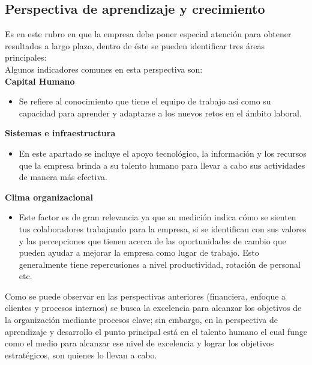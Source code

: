 \subsection{Perspectiva de aprendizaje y crecimiento}

Es en este rubro en que la empresa debe poner especial atención para obtener resultados a largo plazo, dentro de éste se pueden identificar tres áreas principales:\\

Algunos indicadores comunes en esta perspectiva son:\\

\textbf {Capital Humano}
\begin{itemize}
	\item Se refiere al conocimiento que tiene el equipo de trabajo así como su capacidad para aprender y adaptarse a los nuevos retos en el ámbito laboral.
\end{itemize}

\textbf {Sistemas e infraestructura}
\begin{itemize}
	\item En este apartado se incluye el apoyo tecnológico, la información y los recursos que la empresa brinda a su talento humano para llevar a cabo sus actividades de manera más efectiva. 
\end{itemize}

\textbf {Clima organizacional}
\begin{itemize}
	\item Este factor es de gran relevancia ya que su medición indica cómo se sienten tus colaboradores trabajando para la empresa, si se identifican con sus valores y las percepciones que tienen acerca de las oportunidades de cambio que pueden ayudar a mejorar la empresa como lugar de trabajo. Esto generalmente tiene repercusiones a nivel productividad, rotación de personal etc. 
\end{itemize}
Como se puede observar en las perspectivas anteriores (financiera, enfoque a clientes y procesos internos) se busca la excelencia para alcanzar los objetivos de la organización mediante procesos clave; sin embargo, en la perspectiva de aprendizaje y desarrollo el punto principal está en el talento humano el cual funge como el medio para alcanzar ese nivel de excelencia y lograr los objetivos estratégicos, son quienes lo llevan a cabo. \\
\pagebreak
